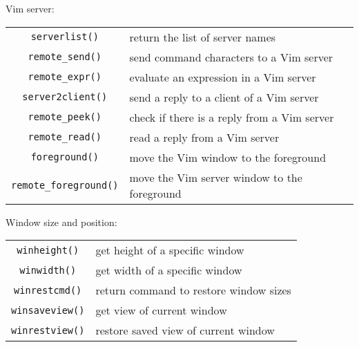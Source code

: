 Vim server:
\label{server-functions}
\begin{center} \begin{tabular}{c l}
				\verb!serverlist()! & return the list of server names \\
				\verb!remote_send()! & send command characters to a Vim server \\
				\verb!remote_expr()! & evaluate an expression in a Vim server \\
				\verb!server2client()! & send a reply to a client of a Vim server \\
				\verb!remote_peek()! & check if there is a reply from a Vim server \\
				\verb!remote_read()! & read a reply from a Vim server \\
				\verb!foreground()! & move the Vim window to the foreground \\
				\verb!remote_foreground()! & move the Vim server window to the foreground \\
\end{tabular} \end{center}

Window size and position:
\label{window-size-functions}
\begin{center} \begin{tabular}{c l}
				\verb!winheight()! & get height of a specific window \\
				\verb!winwidth()! & get width of a specific window \\
				\verb!winrestcmd()! & return command to restore window sizes \\
				\verb!winsaveview()! & get view of current window \\
				\verb!winrestview()! & restore saved view of current window \\
\end{tabular} \end{center}

